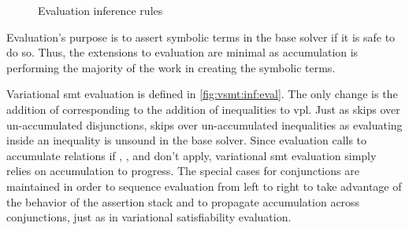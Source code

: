 \label{section:vsmt:evaluation}
%
\begin{figure}
  
  \caption{Evaluation inference rules}%
  \label{fig:vsmt:inf:eval}
\end{figure}
%
Evaluation's
purpose is to assert symbolic terms in the base solver if it is safe to do so.
Thus, the extensions to evaluation are minimal as accumulation is performing the
majority of the work in creating the symbolic terms.

Variational \ac{smt} evaluation is defined in \autoref{fig:vsmt:inf:eval}. The
only change is the addition of \evInEq{} corresponding to the addition of
inequalities to \ac{vpl}. Just as \evOr{} skips over un-accumulated
disjunctions, \evInEq{} skips over un-accumulated inequalities as evaluating
inside an inequality is unsound in the base solver. Since evaluation calls
\evAcc{} to accumulate relations if \evAndL, \evAndR, and \evAnd don't apply,
variational \ac{smt} evaluation simply relies on accumulation to progress. The
special cases for conjunctions are maintained in order to sequence evaluation
from left to right to take advantage of the behavior of the assertion stack and
to propagate accumulation across conjunctions, just as in variational
satisfiability evaluation.


